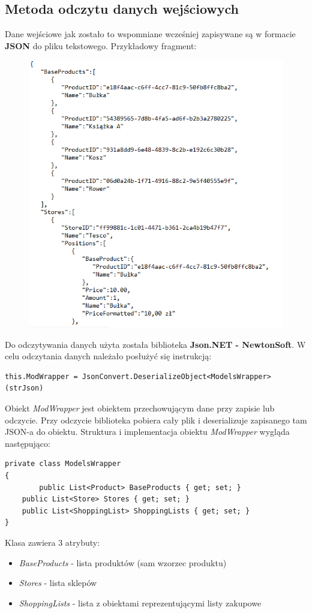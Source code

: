 \documentclass[a4paper]{article}
\begin{document}
\subsection{Metoda odczytu danych wejściowych}
Dane wejściowe jak zostało to wspomniane wcześniej zapisywane są w formacie \textbf{JSON} do pliku tekstowego. Przykładowy fragment:
\begin{figure}[H]
\centering
\includegraphics[width=\textwidth,keepaspectratio]{img/json.png}
\end{figure}
\newpage
Do odczytywania danych użyta została biblioteka \textbf{Json.NET - NewtonSoft}. W celu odczytania danych należało posłużyć się instrukcją:
\begin{lstlisting}
this.ModWrapper = JsonConvert.DeserializeObject<ModelsWrapper>(strJson)
\end{lstlisting} 
\begin{flushleft}
Obiekt \textit{ModWrapper} jest obiektem przechowującym dane przy zapisie lub odczycie. Przy odczycie biblioteka pobiera cały plik i deserializuje zapisanego tam JSON-a do obiektu. Struktura i implementacja obiektu \textit{ModWrapper} wygląda następująco:
\end{flushleft}
\begin{lstlisting}
private class ModelsWrapper
{
		public List<Product> BaseProducts { get; set; }
    public List<Store> Stores { get; set; }
    public List<ShoppingList> ShoppingLists { get; set; }
}
\end{lstlisting}
Klasa zawiera 3 atrybuty:
\begin{itemize}
\item \textit{BaseProducts} - lista produktów (sam wzorzec produktu)
\item \textit{Stores} - lista sklepów
\item \textit{ShoppingLists} - lista z obiektami reprezentującymi listy zakupowe
\end{itemize}
\end{document}
